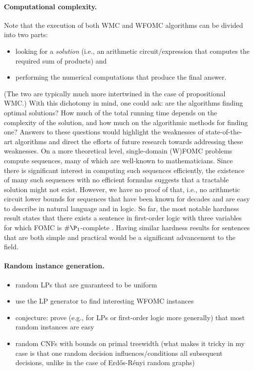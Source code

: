 \paragraph{Computational complexity.}
Note that the execution of both WMC and WFOMC algorithms can be divided into two parts:
\begin{itemize}
\item looking for a \emph{solution} (i.e., an arithmetic circuit/expression that computes the required sum of products) and
\item performing the numerical computations that produce the final answer.
\end{itemize}
(The two are typically much more intertwined in the case of propositional WMC.) With this dichotomy in mind, one could ask: are the algorithms finding optimal solutions? How much of the total running time depends on the complexity of the solution, and how much on the algorithmic methods for finding one? Answers to these questions would highlight the weaknesses of state-of-the-art algorithms and direct the efforts of future research towards addressing these weaknesses. On a more theoretical level, single-domain (W)FOMC problems compute sequences, many of which are well-known to mathematicians. Since there is significant interest in computing such sequences efficiently, the existence of many such sequences with no efficient formulas suggests that a tractable solution might not exist. However, we have no proof of that, i.e., no arithmetic circuit lower bounds for sequences that have been known for decades and are easy to describe in natural language and in logic. So far, the most notable hardness result states that there exists a sentence in first-order logic with three variables for which FOMC is $\#\P_1$-complete \citep{DBLP:conf/pods/BeameBGS15}. Having similar hardness results for sentences that are both simple and practical would be a significant advancement to the field.

\paragraph{Random instance generation.}
\begin{itemize}
\item random LPs that are guaranteed to be uniform
\item use the LP generator to find interesting WFOMC instances
\item conjecture: prove (e.g., for LPs or first-order logic more generally) that most random instances are easy
\item random CNFs with bounds on primal treewidth (what makes it tricky in my case is that one random decision influences/conditions all subsequent decisions, unlike in the case of Erd\H{o}s-R\'enyi random graphs)
\end{itemize}


